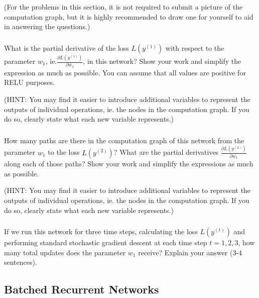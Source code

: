 \documentclass[12pt,a4paper]{article}
\begin{document}
(For the problems in this section, it is not required to submit a picture of the computation graph, but it is highly recommended to draw one for yourself to aid in answering the questions.)

\subsubsection{}

What is the partial derivative of the loss $L(y^{(1)})$ with respect to the parameter $w_1$, ie.$\frac{\partial L(y^{(1)})}{\partial w_1}$, in this network? Show your work and simplify the expression as much as possible. You can assume that all values are positive for RELU purposes. 

\vspace{.5\baselineskip}

(HINT: You may find it easier to introduce additional variables to represent the outputs of individual operations, ie. the nodes in the computation graph. If you do so, clearly state what each new variable represents.)

\subsubsection{}

How many paths are there in the computation graph of this network from the parameter $w_1$ to the loss $L(y^{(2)})$? What are the partial derivatives $\frac{\partial L(y^{(2)})}{\partial w_1}$ along each of those paths? Show your work and simplify the expressions as much as possible.

\vspace{.5\baselineskip}

(HINT: You may find it easier to introduce additional variables to represent the outputs of individual operations, ie. the nodes in the computation graph. If you do so, clearly state what each new variable represents.)

\subsubsection{}

If we run this network for three time steps, calculating the loss $L(y^{(t)})$ and performing standard stochastic gradient descent at each time step $t = 1, 2, 3$, how many total updates does the parameter $w_1$ receive? Explain your answer (3-4 sentences).

\subsection{Batched Recurrent Networks}
\end{document}
